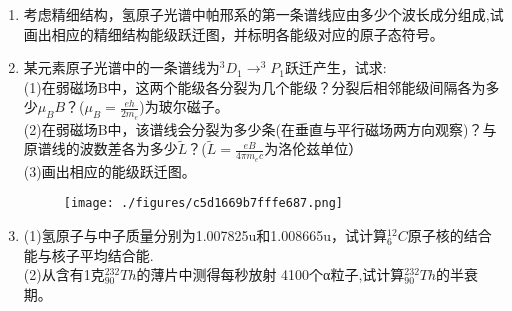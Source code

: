 \begin{enumerate}
\item 考虑精细结构，氢原子光谱中帕邢系的第一条谱线应由多少个波长成分组成,试画出相应的精细结构能级跃迁图，并标明各能级对应的原子态符号。
\item 某元素原子光谱中的一条谱线为$^3D_1 \to ^3P_1$跃迁产生，试求:\\
(1)在弱磁场B中，这两个能级各分裂为几个能级？分裂后相邻能级间隔各为多少$\mu_B B$？($\mu_B=\frac{eh}{2m_e}$)为玻尔磁子。\\
(2)在弱磁场B中，该谱线会分裂为多少条(在垂直与平行磁场两方向观察)？与原谱线的波数差各为多少$\widetilde L$？($\widetilde L=\frac{eB}{4\pi m_e c}$为洛伦兹单位）\\
(3)画出相应的能级跃迁图。
\begin{figure}[ht]
\centering
\texttt{[image: ./figures/c5d1669b7fffe687.png]}
\caption{} \label{fig_SSD05_5}
\end{figure}
\item (1)氢原子与中子质量分别为1.007825u和1.008665u，试计算$^12_6C$原子核的结合能与核子平均结合能.\\
(2)从含有1克$^{232}_{90}Th$的薄片中测得每秒放射 4100个α粒子,试计算$^{232}_{90} Th$的半衰期。

\end{enumerate}

